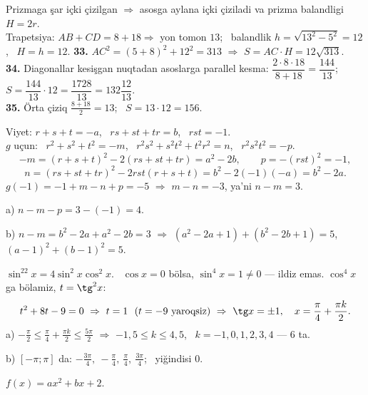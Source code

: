 \newpage
{}
Prizmaga şar içki çizilgan $\Rightarrow$ asosga aylana içki çiziladi va prizma balandligi $H=2r$.\\
Trapetsiya: $AB+CD=8+18\Rightarrow$ yon tomon $13$; \ balandlik $h=\sqrt{13^2-5^2}=12$, \ $H=h=12$.
\textbf{33.} $AC^2=(5+8)^2+12^2=313$ $\Rightarrow$ $S=AC\cdot H=12\sqrt{313}$.\\
\textbf{34.} Diagonallar kesişgan nuqtadan asoslarga parallel kesma: $\dfrac{2\cdot8\cdot18}{8+18}=\dfrac{144}{13}$; \ $S=\dfrac{144}{13}\cdot12=\dfrac{1728}{13}=132\dfrac{12}{13}$.\\
\textbf{35.} Örta çiziq $\frac{8+18}2=13$; \ $S=13\cdot12=156$.

\newpage
{}
Viyet: $r+s+t=-a$, \ $rs+st+tr=b$, \ $rst=-1$.\\
$g$ uçun: \ $r^2+s^2+t^2=-m$, \ $r^2s^2+s^2t^2+t^2r^2=n$, \ $r^2s^2t^2=-p$.
\[-m=(r+s+t)^2-2(rs+st+tr)=a^2-2b,\qquad p=-(rst)^2=-1,\]
\[n=(rs+st+tr)^2-2rst(r+s+t)=b^2-2(-1)(-a)=b^2-2a.\]
$g(-1)=-1+m-n+p=-5$ $\Rightarrow$ $m-n=-3$, ya'ni $n-m=3$.

a) $n-m-p=3-(-1)=4$.

b) $n-m=b^2-2a+a^2-2b=3$ $\Rightarrow$ $(a^2-2a+1)+(b^2-2b+1)=5$, \ $(a-1)^2+(b-1)^2=5$.

\newpage
{}
$\sin^22x=4\sin^2x\cos^2x$. \ $\cos x=0$ bölsa, $\sin^4x=1\ne0$ — ildiz emas. $\cos^4x$ ga bölamiz, $t=\tg^2x$:
\[t^2+8t-9=0\ \Rightarrow\ t=1\ \ (t=-9\ \text{yaroqsiz})\ \Rightarrow\ \tg x=\pm1,\quad x=\frac\pi4+\frac{\pi k}2.\]
a) $-\frac\pi2\le\frac\pi4+\frac{\pi k}2\le\frac{5\pi}2$ $\Rightarrow$ $-1{,}5\le k\le4{,}5$, \ $k=-1,0,1,2,3,4$ — 6 ta.

b) $[-\pi;\pi]$ da: $-\frac{3\pi}4,\ -\frac\pi4,\ \frac\pi4,\ \frac{3\pi}4$; \ yiğindisi $0$.

\newpage
{}
$f(x)=ax^2+bx+2$.


